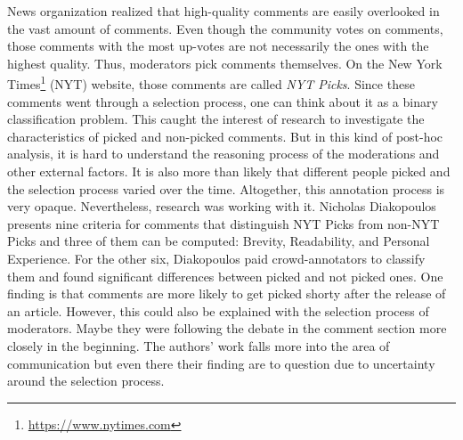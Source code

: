 News organization realized that high-quality comments are easily overlooked in the vast amount of comments. Even though the community votes on comments, those comments with the most up-votes are not necessarily the ones with the highest quality. Thus, moderators pick comments themselves. On the New York Times\footnote{\url{https://www.nytimes.com}} (NYT) website,  those comments are called \textit{NYT Picks}. Since these comments went through a selection process, one can think about it as a binary classification problem. This caught the interest of research to investigate the characteristics of picked and non-picked comments. But in this kind of post-hoc analysis, it is hard to understand the reasoning process of the moderations and other external factors. It is also more than likely that different people picked and the selection process varied over the time. Altogether, this annotation process is very opaque. Nevertheless, research was working with it. Nicholas Diakopoulos~\cite{diakopoulos2015picking} presents nine criteria for comments that distinguish NYT Picks from non-NYT Picks and three of them can be computed: Brevity, Readability, and Personal Experience. For the other six, Diakopoulos paid crowd-annotators to classify them and found significant differences between picked and not picked ones. One finding is that comments are more likely to get picked shorty after the release of an article. However, this could also be explained with the selection process of moderators. Maybe they were following the debate in the comment section more closely in the beginning. The authors' work falls more into the area of communication but even there their finding are to question due to uncertainty around the selection process.


